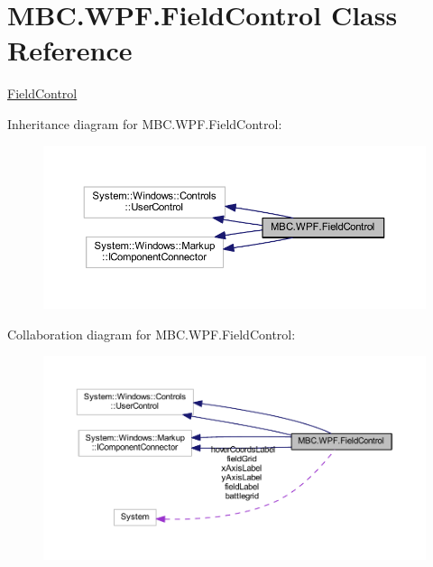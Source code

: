 \hypertarget{class_m_b_c_1_1_w_p_f_1_1_field_control}{\section{M\-B\-C.\-W\-P\-F.\-Field\-Control Class Reference}
\label{class_m_b_c_1_1_w_p_f_1_1_field_control}
}


\hyperlink{class_m_b_c_1_1_w_p_f_1_1_field_control}{Field\-Control}  




Inheritance diagram for M\-B\-C.\-W\-P\-F.\-Field\-Control\-:
\nopagebreak
\begin{figure}[H]
\begin{center}
\leavevmode
\includegraphics[width=350pt]{class_m_b_c_1_1_w_p_f_1_1_field_control__inherit__graph}
\end{center}
\end{figure}


Collaboration diagram for M\-B\-C.\-W\-P\-F.\-Field\-Control\-:
\nopagebreak
\begin{figure}[H]
\begin{center}
\leavevmode
\includegraphics[width=350pt]{class_m_b_c_1_1_w_p_f_1_1_field_control__coll__graph}
\end{center}
\end{figure}
